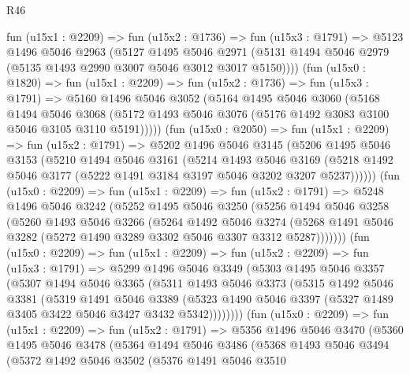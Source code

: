 \begin{lexlean}{R46}
\begin{coremodule}
    fun (u15x1 : @2209) =>
    fun (u15x2 : @1736) =>
    fun (u15x3 : @1791) =>
    @5123
      @1496
      @5046
      @2963
      (@5127
        @1495
        @5046
        @2971
        (@5131 @1494 @5046 @2979 (@5135 @1493 @2990 @3007 @5046 @3012 @3017 @5150))))
    (fun (u15x0 : @1820) =>
    fun (u15x1 : @2209) =>
    fun (u15x2 : @1736) =>
    fun (u15x3 : @1791) =>
    @5160
      @1496
      @5046
      @3052
      (@5164
        @1495
        @5046
        @3060
        (@5168
          @1494
          @5046
          @3068
          (@5172 @1493 @5046 @3076 (@5176 @1492 @3083 @3100 @5046 @3105 @3110 @5191)))))
    (fun (u15x0 : @2050) =>
    fun (u15x1 : @2209) =>
    fun (u15x2 : @1791) =>
    @5202
      @1496
      @5046
      @3145
      (@5206
        @1495
        @5046
        @3153
        (@5210
          @1494
          @5046
          @3161
          (@5214
            @1493
            @5046
            @3169
            (@5218 @1492 @5046 @3177 (@5222 @1491 @3184 @3197 @5046 @3202 @3207 @5237))))))
    (fun (u15x0 : @2209) =>
    fun (u15x1 : @2209) =>
    fun (u15x2 : @1791) =>
    @5248
      @1496
      @5046
      @3242
      (@5252
        @1495
        @5046
        @3250
        (@5256
          @1494
          @5046
          @3258
          (@5260
            @1493
            @5046
            @3266
            (@5264
              @1492
              @5046
              @3274
              (@5268 @1491 @5046 @3282 (@5272 @1490 @3289 @3302 @5046 @3307 @3312 @5287)))))))
    (fun (u15x0 : @2209) =>
    fun (u15x1 : @2209) =>
    fun (u15x2 : @2209) =>
    fun (u15x3 : @1791) =>
    @5299
      @1496
      @5046
      @3349
      (@5303
        @1495
        @5046
        @3357
        (@5307
          @1494
          @5046
          @3365
          (@5311
            @1493
            @5046
            @3373
            (@5315
              @1492
              @5046
              @3381
              (@5319
                @1491
                @5046
                @3389
                (@5323 @1490 @5046 @3397 (@5327 @1489 @3405 @3422 @5046 @3427 @3432 @5342))))))))
    (fun (u15x0 : @2209) =>
    fun (u15x1 : @2209) =>
    fun (u15x2 : @1791) =>
    @5356
      @1496
      @5046
      @3470
      (@5360
        @1495
        @5046
        @3478
        (@5364
          @1494
          @5046
          @3486
          (@5368
            @1493
            @5046
            @3494
            (@5372
              @1492
              @5046
              @3502
              (@5376
                @1491
                @5046
                @3510

\end{coremodule}
\end{lexlean}
